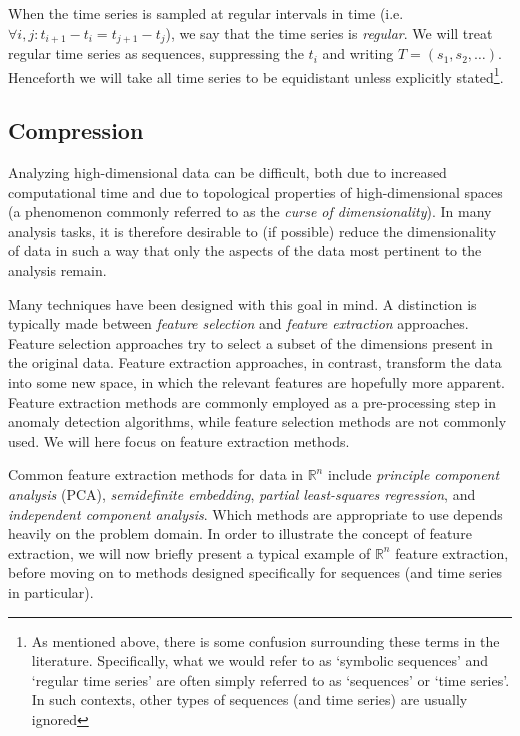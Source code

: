 When the time series is sampled at regular intervals in time (i.e.\ $\forall i, j: t_{i+1} - t_i = t_{j+1} - t_j$), we say that the time series is \emph{regular}. We will treat regular time series as sequences, suppressing the $t_i$ and writing $T = (s_1, s_2, \dots)$. Henceforth we will take all time series to be equidistant unless explicitly stated\footnote{As mentioned above, there is some confusion surrounding these terms in the literature. Specifically, what we would refer to as `symbolic sequences' and `regular time series' are often simply referred to as `sequences' or `time series'. In such contexts, other types of sequences (and time series) are usually ignored}.

\subsection{Compression}
\label{sect:compression}


Analyzing high-dimensional data can be difficult, both due to increased computational time and due to topological properties of high-dimensional spaces (a phenomenon commonly referred to as the \emph{curse of dimensionality}). In many analysis tasks, it is therefore desirable to (if possible) reduce the dimensionality of data in such a way that only the aspects of the data most pertinent to the analysis remain.

Many techniques have been designed with this goal in mind. A distinction is typically made between \emph{feature selection} and \emph{feature extraction} approaches. Feature selection approaches try to select a subset of the dimensions present in the original data. Feature extraction approaches, in contrast, transform the data into some new space, in which the relevant features are hopefully more apparent. Feature extraction methods are commonly employed as a pre-processing step in anomaly detection algorithms, while feature selection methods are not commonly used. We will here focus on feature extraction methods.

Common feature extraction methods for data in $\mathbb{R}^n$ include \emph{principle component analysis} (PCA), \emph{semidefinite embedding}, \emph{partial least-squares regression}, and \emph{independent component analysis}. Which methods are appropriate to use depends heavily on the problem domain. In order to illustrate the concept of feature extraction, we will now briefly present a typical example of $\mathbb{R}^n$ feature extraction, before moving on to methods designed specifically for sequences (and time series in particular).

